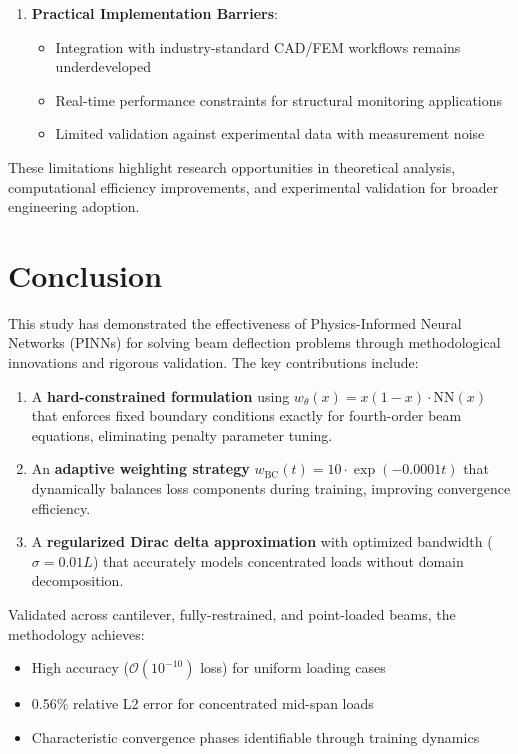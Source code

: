 \documentclass[12pt]{article}
\begin{document}
\begin{enumerate}
\item \textbf{Practical Implementation Barriers}: 
\begin{itemize}
	\item Integration with industry-standard CAD/FEM workflows remains underdeveloped
\item Real-time performance constraints for structural monitoring applications
\item Limited validation against experimental data with measurement noise
\end{itemize}
\end{enumerate}

These limitations highlight research opportunities in theoretical analysis, computational efficiency improvements, and experimental validation for broader engineering adoption.


\section{Conclusion}
This study has demonstrated the effectiveness of Physics-Informed Neural Networks (PINNs) for solving beam deflection problems through methodological innovations and rigorous validation. The key contributions include:

\begin{enumerate}
	\item A \textbf{hard-constrained formulation} using $w_{\theta}(x) = x(1-x)\cdot\text{NN}(x)$ that enforces fixed boundary conditions exactly for fourth-order beam equations, eliminating penalty parameter tuning.
	\item  An \textbf{adaptive weighting strategy} $w_{\text{BC}}(t)=10\cdot\exp(-0.0001t)$ that dynamically balances loss components during training, improving convergence efficiency.
	\item  A \textbf{regularized Dirac delta approximation} with optimized bandwidth ($\sigma = 0.01L$) that accurately models concentrated loads without domain decomposition.
\end{enumerate}

Validated across cantilever, fully-restrained, and point-loaded beams, the methodology achieves:
\begin{itemize}
	\item High accuracy ($\mathcal{O}(10^{-10})$ loss) for uniform loading cases
	\item 0.56\% relative L2 error for concentrated mid-span loads
	\item Characteristic convergence phases identifiable through training dynamics
\end{itemize}
\end{document}
